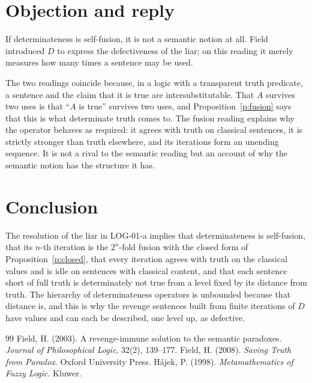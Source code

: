 \documentclass{situationist-preprint}
\begin{document}
\section{Objection and reply}

\begin{objection}
If determinateness is self-fusion, it is not a semantic notion at all. Field introduced $D$ to express the defectiveness of the liar; on this reading it merely measures how many times a sentence may be used.
\end{objection}

\begin{reply}
The two readings coincide because, in a logic with a transparent truth predicate, a sentence and the claim that it is true are intersubstitutable. That $A$ survives two uses is that \enquote{$A$ is true} survives two uses, and Proposition~\ref{p:fusion} says that this is what determinate truth comes to. The fusion reading explains why the operator behaves as \citet{Field2008} required: it agrees with truth on classical sentences, it is strictly stronger than truth elsewhere, and its iterations form an unending sequence. It is not a rival to the semantic reading but an account of why the semantic notion has the structure it has.
\end{reply}

\section{Conclusion}

The resolution of the liar in LOG-01-a implies that determinateness is self-fusion, that its $n$-th iteration is the $2^n$-fold fusion with the closed form of Proposition~\ref{p:closed}, that every iteration agrees with truth on the classical values and is idle on sentences with classical content, and that each sentence short of full truth is determinately not true from a level fixed by its distance from truth. The hierarchy of determinateness operators is unbounded because that distance is, and this is why the revenge sentences built from finite iterations of $D$ have values and can each be described, one level up, as defective.

\begin{thebibliography}{99}\small
{} Field, H. (2003). A revenge-immune solution to the semantic paradoxes. \emph{Journal of Philosophical Logic}, 32(2), 139--177.
 Field, H. (2008). \emph{Saving Truth from Paradox}. Oxford University Press.
 H\'ajek, P. (1998). \emph{Metamathematics of Fuzzy Logic}. Kluwer.
\end{thebibliography}
\end{document}
